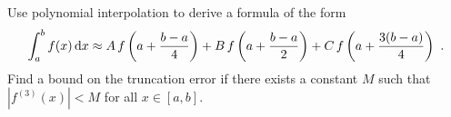 \begin{question}
Use polynomial interpolation to derive a formula of the form
\[
\int_a^b f(x)\,\mathrm{d}x \approx A\,f\left(a + \frac{b-a}{4}\right)
+ B\,f\left(a+\frac{b-a}{2}\right)
+ C\,f\left(a+\frac{3(b-a)}{4}\right) \ .
\]
Find a bound on the truncation error if there exists a constant $M$
such that $|f^{(3)}(x)|<M$ for all $x\in[a,b]$.
\label{diffQ21}
\end{question}




